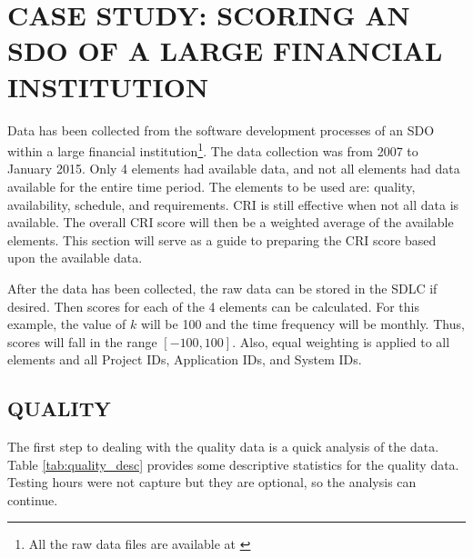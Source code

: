 \documentclass[SDSUThesis.tex]{subfiles}
\begin{document}
\section{CASE STUDY: SCORING AN SDO OF A LARGE FINANCIAL INSTITUTION}

    Data has been collected from the software development processes of
    an SDO within a large financial institution\footnote{All the raw data 
    files are available at \cite{Swanstrom2015}}.
    The data collection was from 2007 to January 2015. Only 4 elements had available
    data, and not all elements had data available for the entire time period.  The
    elements to be used are: quality, availability, schedule, and requirements.
    CRI is still effective when not all data is available.
    The overall CRI score will then be a 
    weighted average of the available elements. 
    This section will serve as a guide to preparing the CRI score
    based upon the available data.  

    After the data has been collected, the raw data can be stored in the SDLC
    if desired.  Then scores for each of the 4 elements can be calculated.
    For this example, the value of $k$ will be 100 and the time
    frequency will be monthly.  Thus, scores will fall
    in the range $[-100,100]$.  Also, equal weighting is applied to 
    all elements and all Project IDs, Application IDs, and System IDs.
    
    \subsection{QUALITY}
        The first step to dealing with the quality data is a quick
        analysis of the data.  Table \ref{tab:quality_desc} provides
        some descriptive statistics for the quality data.  Testing hours
        were not capture but they are optional, so the analysis can 
        continue.
        
\end{document}
